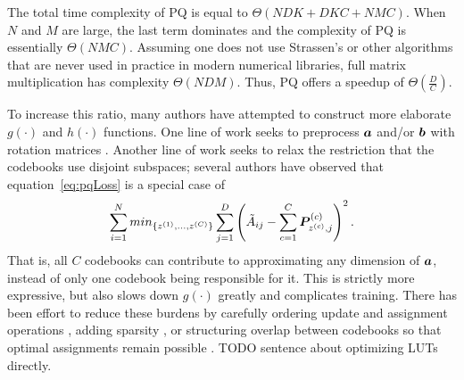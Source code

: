 The total time complexity of PQ is equal to $\Theta(NDK + DKC + NMC)$. When $N$ and $M$ are large, the last term dominates and the complexity of PQ is essentially $\Theta(NMC)$.
Assuming one does not use Strassen's or other algorithms that are never used in practice in modern numerical libraries, full matrix multiplication has complexity $\Theta(NDM)$. Thus, PQ offers a speedup of $\Theta(\frac{D}{C})$.

To increase this ratio, many authors have attempted to construct more elaborate $g(\cdot)$ and $h(\cdot)$ functions. One line of work seeks to preprocess $\bm{a}$ and/or $\bm{b}$ with rotation matrices \cite{opq,cartesianKmeans,lopq}. Another line of work seeks to relax the restriction that the codebooks use disjoint subspaces; several authors \cite{aq,cq,otq,sq,grvq,stackedQuantizers} have observed that equation~\ref{eq:pqLoss} is a special case of
\begin{align} \label{eq:nonOrthogonal}
    \sum_{i=1}^N min_{\{z^{(1)},\ldots,z^{(C)}\}} \sum_{j=1}^D \left( \tilde{A}_{ij} - \sum_{c=1}^C \bm{P}^{(c)}_{z^{(c)},j} \right) ^2.
\end{align}
That is, all $C$ codebooks can contribute to approximating any dimension of $\bm{a}$, instead of only one codebook being responsible for it. This is strictly more expressive, but also slows down $g(\cdot)$ greatly and complicates training. There has been effort to reduce these burdens by carefully ordering update and assignment operations \cite{stackedQuantizers}, adding sparsity \cite{sq}, or structuring overlap between codebooks so that optimal assignments remain possible \cite{otq}. TODO sentence about optimizing LUTs directly.






